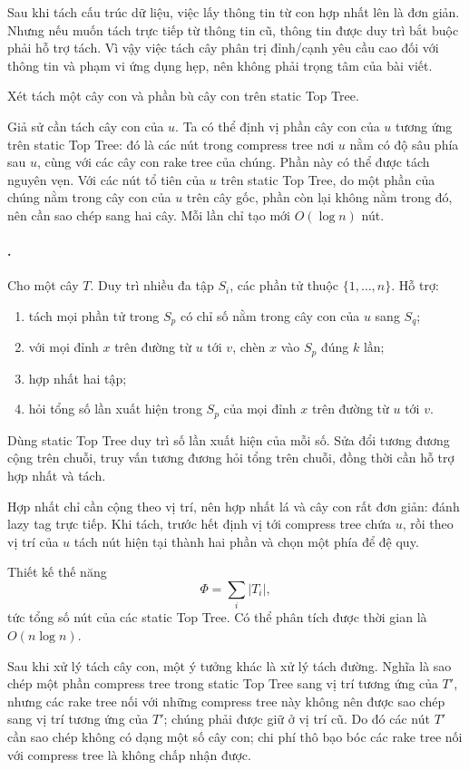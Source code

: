 \documentclass[11pt]{article}
\begin{document}
Sau khi tách cấu trúc dữ liệu, việc lấy thông tin từ con hợp nhất lên là đơn
giản. Nhưng nếu muốn tách trực tiếp từ thông tin cũ, thông tin được duy trì bắt
buộc phải hỗ trợ tách. Vì vậy việc tách cây phân trị đỉnh/cạnh yêu cầu cao đối
với thông tin và phạm vi ứng dụng hẹp, nên không phải trọng tâm của bài viết.

Xét tách một cây con và phần bù cây con trên static Top Tree.

Giả sử cần tách cây con của \(u\). Ta có thể định vị phần cây con của \(u\)
tương ứng trên static Top Tree: đó là các nút trong compress tree nơi \(u\) nằm
có độ sâu phía sau \(u\), cùng với các cây con rake tree của chúng. Phần này có
thể được tách nguyên vẹn. Với các nút tổ tiên của \(u\) trên static Top Tree,
do một phần của chúng nằm trong cây con của \(u\) trên cây gốc, phần còn lại
không nằm trong đó, nên cần sao chép sang hai cây. Mỗi lần chỉ tạo mới
\(O(\log n)\) nút.

\paragraph{.}
Cho một cây \(T\). Duy trì nhiều đa tập \(S_i\), các phần tử thuộc
\(\{1,\ldots,n\}\). Hỗ trợ:
\begin{enumerate}
  \item tách mọi phần tử trong \(S_p\) có chỉ số nằm trong cây con của \(u\)
  sang \(S_q\);
  \item với mọi đỉnh \(x\) trên đường từ \(u\) tới \(v\), chèn \(x\) vào
  \(S_p\) đúng \(k\) lần;
  \item hợp nhất hai tập;
  \item hỏi tổng số lần xuất hiện trong \(S_p\) của mọi đỉnh \(x\) trên đường
  từ \(u\) tới \(v\).
\end{enumerate}

Dùng static Top Tree duy trì số lần xuất hiện của mỗi số. Sửa đổi tương đương
cộng trên chuỗi, truy vấn tương đương hỏi tổng trên chuỗi, đồng thời cần hỗ trợ
hợp nhất và tách.

Hợp nhất chỉ cần cộng theo vị trí, nên hợp nhất lá và cây con rất đơn giản: đánh
lazy tag trực tiếp. Khi tách, trước hết định vị tới compress tree chứa \(u\),
rồi theo vị trí của \(u\) tách nút hiện tại thành hai phần và chọn một phía để
đệ quy.

Thiết kế thế năng
\[
  \Phi=\sum_i |T_i|,
\]
tức tổng số nút của các static Top Tree. Có thể phân tích được thời gian là
\(O(n\log n)\).

Sau khi xử lý tách cây con, một ý tưởng khác là xử lý tách đường. Nghĩa là sao
chép một phần compress tree trong static Top Tree sang vị trí tương ứng của
\(T'\), nhưng các rake tree nối với những compress tree này không nên được sao
chép sang vị trí tương ứng của \(T'\); chúng phải được giữ ở vị trí cũ. Do đó
các nút \(T'\) cần sao chép không có dạng một số cây con; chi phí thô bạo bóc
các rake tree nối với compress tree là không chấp nhận được.
\end{document}
